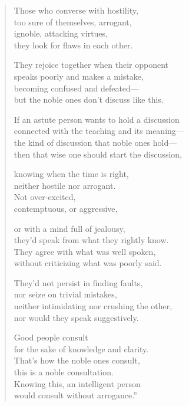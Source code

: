 \documentclass[12pt,openany]{book}%
\begin{document}
\begin{verse}%
Those who converse with hostility, \\
too sure of themselves, arrogant, \\
ignoble, attacking virtues, \\
they look for flaws in each other. 

They rejoice together when their opponent \\
speaks poorly and makes a mistake, \\
becoming confused and defeated—\\
but the noble ones don’t discuss like this. 

If an astute person wants to hold a discussion \\
connected with the teaching and its meaning—\\
the kind of discussion that noble ones hold—\\
then that wise one should start the discussion, 

knowing when the time is right, \\
neither hostile nor arrogant. \\
Not over-excited, \\
contemptuous, or aggressive, 

or with a mind full of jealousy, \\
they’d speak from what they rightly know. \\
They agree with what was well spoken, \\
without criticizing what was poorly said. 

They’d not persist in finding faults, \\
nor seize on trivial mistakes, \\
neither intimidating nor crushing the other, \\
nor would they speak suggestively. 

Good people consult \\
for the sake of knowledge and clarity. \\
That’s how the noble ones consult, \\
this is a noble consultation. \\
Knowing this, an intelligent person \\
would consult without arrogance.” 

%
\end{verse}
\end{document}
